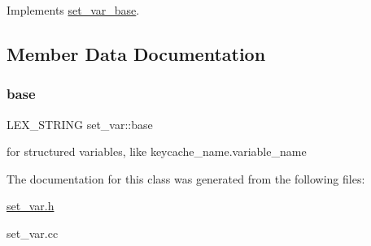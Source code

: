 Implements \mbox{\hyperlink{classset__var__base}{set\+\_\+var\+\_\+base}}.



\subsection{Member Data Documentation}
\mbox{\label{classset__var_a8eeb18aa84a3652c4df76ce222e2a14c}} 
\subsubsection{\texorpdfstring{base}{base}}
{\footnotesize\ttfamily L\+E\+X\+\_\+\+S\+T\+R\+I\+NG set\+\_\+var\+::base}

for structured variables, like keycache\+\_\+name.\+variable\+\_\+name 

The documentation for this class was generated from the following files\+:\begin{DoxyCompactItemize}
\item 
\mbox{\hyperlink{set__var_8h}{set\+\_\+var.\+h}}\item 
set\+\_\+var.\+cc\end{DoxyCompactItemize}
